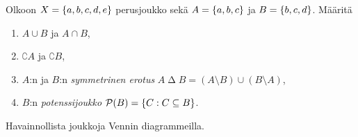 \documentclass[12pt,a4paper]{article}
\begin{document}
\begin{exercise}
Olkoon \(X = \left\lbrace a, b, c, d, e\right\rbrace\) perusjoukko sekä
\(A = \left\lbrace a, b, c\right\rbrace\) ja \(B = \left\lbrace b, c, d\right\rbrace\).
Määritä
\begin{enumerate}[label=\alph*), nosep]
\item \(A \cup B\) ja \(A \cap B\),
\item \(\complement{A}\) ja \(\complement{B}\),
\item \(A\):n ja \(B\):n \emph{symmetrinen erotus} \(A \mathbin{\Delta} B = (A
\setminus B) \cup (B \setminus A)\),
\item \(B\):n \emph{potenssijoukko} \(\mathcal{P}\!\left(B\right) = \left\lbrace C : C
\subseteq B\right\rbrace\).
\end{enumerate}
Havainnollista joukkoja Vennin diagrammeilla.
\end{exercise}
\end{document}
